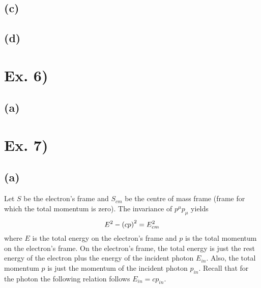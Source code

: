 \documentclass[oneside, 10pt, notitlepage]{book}
\begin{document}
\subsection*{(c)}










\subsection*{(d)}









\section*{Ex. 6)}
\subsection*{(a)}















\section*{Ex. 7)}
\subsection*{(a)}

Let \(S\) be the electron's frame and \(S_{cm}\) be the centre of mass frame (frame for which the total momentum is zero). The invariance of \(p^{\mu}p_{\mu}\) yields 
\begin{equation}\label{eq:elepos}
    E^2 - \left(cp\right)^2 = E_{cm}^2
\end{equation}
where \(E\) is the total energy on the electron's frame and \(p\) is the total momentum on the electron's frame. On the electron's frame, the total energy is just the rest energy of the electron plus the energy of the incident photon \(E_{in}\). Also, the total momentum \(p\) is just the momentum of the incident photon \(p_{in}\). Recall that for the photon the following relation follows \(E_{in} = cp_{in}\).
\end{document}
